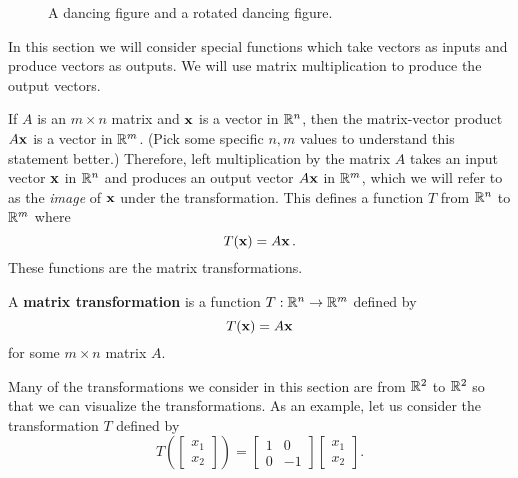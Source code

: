 \begin{figure}[ht]
\begin{center}
\caption{A dancing figure and a rotated dancing figure.}
\label{F:Rotate_dance}
\end{center}
\end{figure}


In this section we will consider special functions which take vectors as inputs and produce vectors as outputs. We will use matrix multiplication to produce the output vectors.

If $A$ is an $m \times n$ matrix and $\mathbf{x}$ is a vector in $\mathbb{R}^n$, then the matrix-vector product $A \mathbf{x}$ is a vector in $\mathbb{R}^m$. (Pick some specific $n, m$ values to understand this statement better.) Therefore, left multiplication by the matrix $A$ takes an input vector $\mathbf{x}$ in $\mathbb{R}^n$ and produces an output vector $A\mathbf{x}$ in $\mathbb{R}^m$, which we will refer to as the \emph{image} of $\mathbf{x}$ under the transformation. This defines a function $T$ from $\mathbb{R}^n$ to $\mathbb{R}^m$ where
\[ T(\mathbf{x}) = A \mathbf{x} \, .\]
These functions are the matrix transformations. 

\begin{definition} A \textbf{matrix transformation} is a function $T: \mathbb{R}^n \to \mathbb{R}^m$ defined by 
\[T(\mathbf{x}) = A\mathbf{x}\]
for some $m \times n$ matrix $A$. 
\end{definition}

Many of the transformations we consider in this section are from $\mathbb{R}^2$ to $\mathbb{R}^2$ so that we can visualize the transformations.  As an example, let us consider the transformation $T$ defined by 
\[T\left(\left[ \begin{array}{c} x_1 \\ x_2 \end{array} \right] \right) = \left[ \begin{array}{cr} 1&0 \\ 0&-1 \end{array} \right]\left[ \begin{array}{c} x_1 \\ x_2 \end{array} \right]. \]

